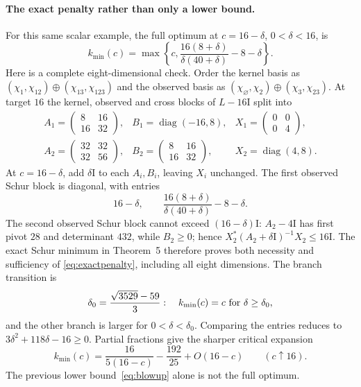 \documentclass[11pt,a4paper]{article}
\newcommand{\id}{\mathrm I}
\begin{document}
\paragraph{The exact penalty rather than only a lower bound.}
For this same scalar example, the full optimum at $c=16-\delta$,
$0<\delta<16$, is
\begin{equation}\label{eq:exactpenalty}
 k_{\min}(c)=\max\left\{c,\frac{16(8+\delta)}{\delta(40+\delta)}-8-\delta\right\}.
\end{equation}
Here is a complete eight-dimensional check. Order the kernel basis as
$(\chi_1,\chi_{12})\oplus(\chi_{13},\chi_{123})$ and the observed basis as
$(\chi_\varnothing,\chi_2)\oplus(\chi_3,\chi_{23})$. At target $16$ the
kernel, observed and cross blocks of $L-16\id$ split into
\[
\begin{array}{lll}
 A_1=\begin{pmatrix}8&16\\16&32\end{pmatrix},&
 B_1=\operatorname{diag}(-16,8),&
 X_1=\begin{pmatrix}0&0\\0&4\end{pmatrix},\\[6pt]
 A_2=\begin{pmatrix}32&32\\32&56\end{pmatrix},&
 B_2=\begin{pmatrix}8&16\\16&32\end{pmatrix},&
 X_2=\operatorname{diag}(4,8).
\end{array}
\]
At $c=16-\delta$, add $\delta\id$ to each $A_i,B_i$, leaving $X_i$
unchanged. The first observed Schur block is diagonal, with entries
\[
 16-\delta,\qquad
 \frac{16(8+\delta)}{\delta(40+\delta)}-8-\delta.
\]
The second observed Schur block cannot exceed $(16-\delta)\id$:
$A_2-4\id$ has first pivot $28$ and determinant $432$, while $B_2\geq0$;
hence $X_2^*(A_2+\delta\id)^{-1}X_2\leq16\id$. The exact Schur minimum
in Theorem~5 therefore proves both necessity and sufficiency of
\eqref{eq:exactpenalty}, including all eight dimensions.
The branch transition is
\[
 \delta_0=\frac{\sqrt{3529}-59}{3}:
 \quad k_{\min}(c)=c\ \hbox{for }\delta\geq\delta_0,
\]
and the other branch is larger for $0<\delta<\delta_0$. Comparing
the entries reduces to $3\delta^2+118\delta-16\geq0$.
Partial fractions give the sharper critical expansion
\begin{equation}\label{eq:residue}
 k_{\min}(c)=\frac{16}{5(16-c)}-\frac{192}{25}+O(16-c)
 \qquad(c\uparrow16).
\end{equation}
The previous lower bound~\eqref{eq:blowup} alone is not the full optimum.
\end{document}
